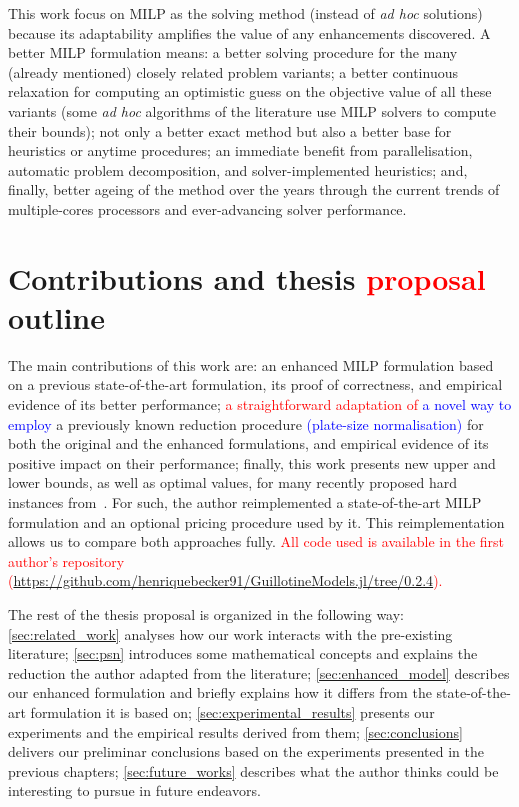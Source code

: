 \documentclass[ppgc,tese,english,formais,babel]{iiufrgs}
\newif\iffinalversion
\newcommand{\newtext}[1]{\iffinalversion%
#1%
\else%
\textcolor{blue}{#1}%
\fi%
}
\newcommand{\oldtext}[1]{\iffinalversion%
\else%
\textcolor{red}{#1}%
\fi%
}
\begin{document}
This work focus on MILP as the solving method (instead of \emph{ad hoc} solutions) because its adaptability amplifies the value of any enhancements discovered.
A better MILP formulation means:
a better solving procedure for the many (already mentioned) closely related problem variants;
a better continuous relaxation for computing an optimistic guess on the objective value of all these variants (some \emph{ad hoc} algorithms of the literature use MILP solvers to compute their bounds);
not only a better exact method but also a better base for heuristics or anytime procedures;
an immediate benefit from parallelisation, automatic problem decomposition, and solver-implemented heuristics;
and, finally, better ageing of the method over the years through the current trends of multiple-cores processors and ever-advancing solver performance.

\section{Contributions and thesis \oldtext{proposal} outline}
\label{sec:contributions}

The main contributions of this work are:
an enhanced MILP formulation based on a previous state-of-the-art formulation, its proof of correctness, and empirical evidence of its better performance;
\oldtext{a straightforward adaptation of}\newtext{a novel way to employ} a previously known reduction procedure \newtext{(plate-size normalisation)} for both the original and the enhanced formulations, and empirical evidence of its positive impact on their performance;
finally, this work presents new upper and lower bounds, as well as optimal values, for many recently proposed hard instances from~\citet{velasco:2019}.
For such, the author reimplemented a state-of-the-art MILP formulation and an optional pricing procedure used by it.
This reimplementation allows us to compare both approaches fully.
\oldtext{All code used is available in the first author's repository ({\small\url{https://github.com/henriquebecker91/GuillotineModels.jl/tree/0.2.4}}).}

The rest of the thesis proposal is organized in the following way:
\cref{sec:related_work} analyses how our work interacts with the pre-existing literature;
\cref{sec:psn} introduces some mathematical concepts and explains the reduction the author adapted from the literature;
\cref{sec:enhanced_model} describes our enhanced formulation and briefly explains how it differs from the state-of-the-art formulation it is based on;
\cref{sec:experimental_results} presents our experiments and the empirical results derived from them;
\cref{sec:conclusions} delivers our preliminar conclusions based on the experiments presented in the previous chapters;
\cref{sec:future_works} describes what the author thinks could be interesting to pursue in future endeavors.
\end{document}
